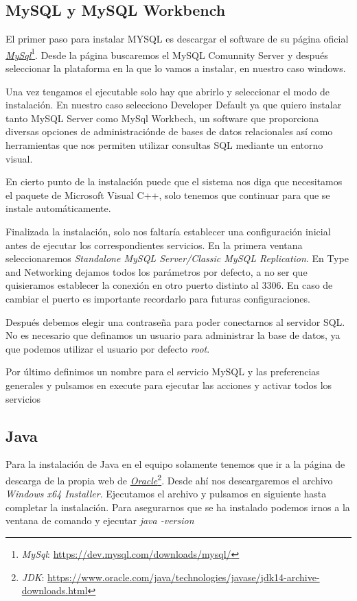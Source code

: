 \subsection{MySQL y MySQL Workbench}

El primer paso para instalar MYSQL es descargar el software de su página oficial \href{https://dev.mysql.com/downloads/mysql/}{\textit{MySql}}\footnote{\textit{MySql}: \url{https://dev.mysql.com/downloads/mysql/}}. Desde la página buscaremos el MySQL Comunnity Server y después seleccionar la plataforma en la que lo vamos a instalar, en nuestro caso windows.

Una vez tengamos el ejecutable solo hay que abrirlo y seleccionar el modo de instalación. En nuestro caso selecciono Developer Default ya que quiero instalar tanto MySQL Server como MySql Workbech, un software que proporciona diversas opciones de administraciónde de bases de datos relacionales así como herramientas que nos permiten utilizar consultas SQL mediante un entorno visual.

En cierto punto de la instalación puede que el sistema nos diga que necesitamos el paquete de Microsoft Visual C++, solo tenemos que continuar para que se instale automáticamente.

Finalizada la instalación, solo nos faltaría establecer una configuración inicial antes de ejecutar los correspondientes servicios. En la primera ventana seleccionaremos \textit{Standalone MySQL Server/Classic MySQL Replication}. En Type and Networking dejamos todos los parámetros por defecto, a no ser que quisieramos establecer la conexión en otro puerto distinto al 3306. En caso de cambiar el puerto es importante recordarlo para futuras configuraciones.

Después debemos elegir una contraseña para poder conectarnos al servidor SQL. No es necesario que definamos un usuario para administrar la base de datos, ya que podemos utilizar el usuario por defecto \textit{root}.

Por último definimos un nombre para el servicio MySQL y las preferencias generales y pulsamos en execute para ejecutar las acciones y activar todos los servicios

\subsection{Java}

Para la instalación de Java en el equipo solamente tenemos que ir a la página de descarga de la propia web de \href{https://www.oracle.com/java/technologies/javase/jdk14-archive-downloads.html}{\textit{Oracle}}\footnote{\textit{JDK}: \url{https://www.oracle.com/java/technologies/javase/jdk14-archive-downloads.html}}. Desde ahí nos descargaremos el archivo \textit{Windows x64 Installer}. Ejecutamos el archivo y pulsamos en siguiente hasta completar la instalación. Para asegurarnos que se ha instalado podemos irnos a la ventana de comando y ejecutar \textit{java -version}


